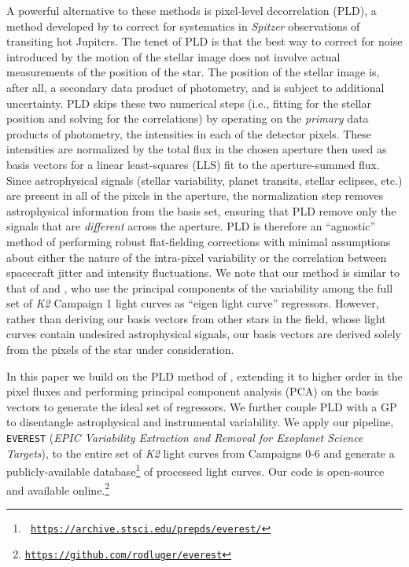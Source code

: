 \documentclass[]{emulateapj}
\newcommand{\note}[1]{{\color{red} #1}}
\begin{document}
A powerful alternative to these methods is pixel-level decorrelation (PLD), a method developed
by \cite{DEM15} to correct for systematics in \emph{Spitzer} observations of transiting
hot Jupiters. The tenet of PLD is that the best way to correct for noise introduced by
the motion of the stellar image does not involve actual measurements of the position
of the star. The position of the stellar image is, after all, a secondary data product
of photometry, and is subject to additional uncertainty.
PLD skips these two numerical steps (i.e., fitting for the stellar position and solving
for the correlations) by operating on the \emph{primary} data products of photometry, the
intensities in each of the detector pixels. 
These intensities are normalized by the
total flux in the chosen aperture then used as basis vectors for a linear least-squares 
(LLS) fit to the aperture-summed flux. Since astrophysical signals (stellar variability,
planet transits, stellar eclipses, etc.) are present in all of the pixels in the aperture,
the normalization step removes astrophysical information from the basis set, ensuring
that PLD remove only the signals that are \emph{different} across the aperture. PLD is
therefore an ``agnostic'' method of performing robust flat-fielding corrections with
minimal assumptions about either the nature of the intra-pixel variability or the correlation 
between spacecraft jitter and intensity fluctuations. We note that our method is similar 
to that of \cite{DFM15} and \cite{MON15}, who use the principal components of the variability 
among the full set of \emph{K2} Campaign 1 light curves as ``eigen light curve'' regressors.
However, rather than deriving our basis vectors from other stars in the field, whose
light curves contain undesired astrophysical signals, our basis vectors are derived
solely from the pixels of the star under consideration.

In this paper we build on the PLD method of \cite{DEM15}, extending it to higher order
in the pixel fluxes and performing principal component analysis (PCA) on the basis
vectors to generate the ideal set of regressors. We further couple PLD with a GP to 
disentangle astrophysical and instrumental variability. We apply our pipeline, \texttt{EVEREST}
(\emph{EPIC Variability Extraction and Removal for
Exoplanet Science Targets}), to the entire set of \emph{K2} light curves from Campaigns 0-6 and generate a 
publicly-available database\footnote{\texttt{\note{\url{https://archive.stsci.edu/prepds/everest/}}}}
of processed light curves. Our code is open-source and
available online.\footnote{\texttt{\url{https://github.com/rodluger/everest}}}
\end{document}
